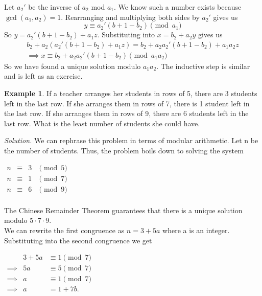 \documentclass[letterpaper]{article}
\theoremstyle{plain}
\theoremstyle{definition}
\newtheorem{example}[thm]{Example}
\theoremstyle{remark}
\begin{document}
Let $a_2'$ be the inverse of $a_2$ mod $a_1$. We know such a number exists because $\gcd(a_1,a_2)=1$. 
Rearranging and multiplying both sides by $a_2'$ gives us $$y \equiv a_2'(b+1-b_2) \pmod{a_1}$$
So $y = a_2'(b+1-b_2) + a_1z$. Substituting into $x = b_2 + a_2y$ gives us 
\begin{align*}
    b_2 + a_2(a_2'(b+1-b_2)+a_1z)=b_2+a_2a_2'(b+1-b_2)+a_1a_2z\\
    \implies x \equiv b_2+a_2a_2'(b+1-b_2) \pmod{a_1a_2}
\end{align*}
So we have found a unique solution modulo $a_1a_2$. The inductive step is similar and is left as an exercise.
\begin{mdframed}
    \begin{example}
    If a teacher arranges her students in rows of 5, there are 3 students left in the last row.
    If she arranges them in rows of 7, there is 1 student left in the last row. If she arranges them in rows of 9, 
    there are 6 students left in the last row. What is the least number of students she could have.
    \end{example}
\end{mdframed}
\emph{Solution.} We can rephrase this problem in terms of modular arithmetic. Let n be the number of students. Thus, the problem boils down to solving the system
    \begin{center}
        $\begin{array}{rcll}
            n &\equiv &3 &\pmod{5}\\
            n &\equiv &1 &\pmod{7}\\
            n &\equiv &6 &\pmod{9}\\
        \end{array}$
    \end{center}
    The Chinese Remainder Theorem guarantees that there is a unique solution modulo $5\cdot 7 \cdot 9$.\\
    We can rewrite the first congruence as $n = 3 + 5a$ where a is an integer.
    Substituting into the second congruence we get 
    \begin{center}
        $\begin{array}{rrll}
            &3+5a &\equiv 1 \pmod{7} \\
         \implies &5a &\equiv 5 \pmod{7} \\
         \implies &a &\equiv 1 \pmod{7}\\
         \implies &a &= 1 + 7b.
        \end{array}$
    \end{center}
\end{document}
